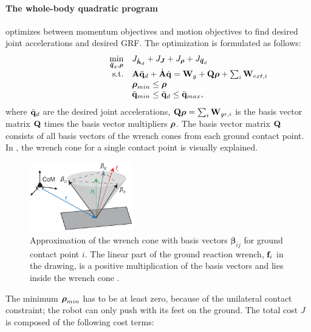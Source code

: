 \paragraph{The whole-body quadratic program} \cite{koolen2016design} optimizes between momentum objectives and motion objectives to find desired joint accelerations and desired \ac{GRF}. The optimization is formulated as follows:
\begin{equation}
\begin{array}{rlcl}
\displaystyle \min_{\bs{\ddot{q}}_d,\bs{\rho}} & \multicolumn{3}{l}{J_{\bs{\dot{h}}_d} + J_{\bs{J}} + J_{\bs{\rho}} + J_{\bs{\ddot{q}}_d} } \\%
\textrm{s.t.} & \matr{A}\ddqjntd + \dot{\matr{A}}\dqjnt = \matr{W}_g + \matr{Q}\bs{\rho}+\sum_i\matr{W}_{ext,i}\\
&\displaystyle \bs{\rho}_{min} \leq \bs{\rho}\\
&\ddot{\qjnt}_{min} \leq \ddqjntd \leq \ddot{\qjnt}_{max},
\end{array}
\end{equation}
where $\ddot{\mathbf{q}}_d$ are the desired joint accelerations, $\mathbf{Q}\boldsymbol{\rho} = \sum_i\mathbf{W}_{gr,i}$ is the basis vector matrix $\mathbf{Q}$ times the basis vector multipliers $\boldsymbol{\rho}$. The basis vector matrix $\mathbf{Q}$ consists of all basis vectors of the wrench cones from each ground contact point. In , the wrench cone for a single contact point is visually explained.
\begin{figure}
\centering
\includegraphics[width=0.4\textwidth]{STYLESTUFF/wrenchcone.png}
\caption{Approximation of the wrench cone with basis vectors $\boldsymbol{\beta}_{ij}$ for ground contact point $i$. The linear part of the ground reaction wrench, $\mathbf{f}_i$ in the drawing, is a positive multiplication of the basis vectors and lies inside the wrench cone \cite{koolen2016design}. }
\label{fig:wrenchcone}
\end{figure}
The minimum $\boldsymbol{\rho}_{min}$ has to be at least zero, because of the unilateral contact constraint; the robot can only push with its feet on the ground. The total cost $J$ is composed of the following cost terms:
